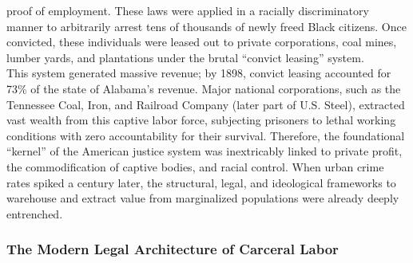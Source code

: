 \documentclass[
]{article}
\begin{document}
proof of employment. These laws were applied in a racially
discriminatory manner to arbitrarily arrest tens of thousands of newly
freed Black citizens. Once convicted, these individuals were leased out
to private corporations, coal mines, lumber yards, and plantations under
the brutal ``convict leasing'' system.\\
This system generated massive revenue; by 1898, convict leasing
accounted for 73\% of the state of Alabama's revenue. Major national
corporations, such as the Tennessee Coal, Iron, and Railroad Company
(later part of U.S. Steel), extracted vast wealth from this captive
labor force, subjecting prisoners to lethal working conditions with zero
accountability for their survival. Therefore, the foundational
``kernel'' of the American justice system was inextricably linked to
private profit, the commodification of captive bodies, and racial
control. When urban crime rates spiked a century later, the structural,
legal, and ideological frameworks to warehouse and extract value from
marginalized populations were already deeply entrenched.

\subsubsection{\texorpdfstring{\textbf{The Modern Legal Architecture of
Carceral
Labor}}{The Modern Legal Architecture of Carceral Labor}}\label{the-modern-legal-architecture-of-carceral-labor}
\end{document}
